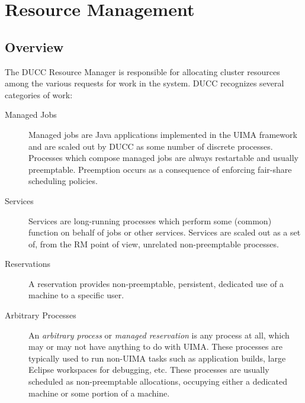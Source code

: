 % 
% 
% 
% 
\ifpdf
\else
{}
\fi
\chapter{Resource Management}
\label{chap:rm}
    \section{Overview}

    The DUCC Resource Manager is responsible for allocating cluster resources among the various 
    requests for work in the system. DUCC recognizes several categories of work: 

    \begin{description}
        \item[Managed Jobs]
            Managed jobs are Java applications implemented in the UIMA framework
            and are scaled out by DUCC as some number of discrete processes.  Processes which 
            compose managed jobs are always restartable and usually preemptable.  Preemption
            occurs as a consequence of enforcing fair-share scheduling policies.

        \item[Services]
            Services are long-running processes which perform some (common) function on behalf of 
            jobs or other services.  Services are scaled out as a set of, from the RM point of view,
            unrelated non-preemptable processes.  

        \item[Reservations]
            A reservation provides non-preemptable, persistent, dedicated use of a machine to a specific user.

        \item[Arbitrary Processes]
            An {\em arbitrary process} or {\em managed reservation} is any process at all, which may
            or may not have anything to do with UIMA.  These processes are typically used to
            run non-UIMA tasks such as application builds, large Eclipse workspaces for debugging,
            etc. These processes are usually scheduled as non-preemptable allocations,
            occupying either a dedicated machine or some portion of a machine.

    \end{description}
          
